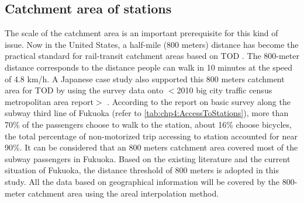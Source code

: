 \subsection{Catchment area of stations}
%
The scale of the catchment area is an important prerequisite for this kind of issue. Now in the United States, a half-mile (800 meters) distance has become the practical standard for rail-transit catchment areas based on TOD \cite{guerra2013half}. The 800-meter distance corresponds to the distance people can walk in 10 minutes at the speed of 4.8 km/h. A Japanese case study also supported this 800 meters catchment area for TOD by using the survey data onto $<$2010 big city traffic census metropolitan area report$>$ \cite{tadakatsu2015empirical}. According to the report on basic survey along the subway third line of Fukuoka (refer to \ref{tab:chp4:AccessToStations}), more than 70\% of the passengers choose to walk to the station, about 16\% choose bicycles, the total percentage of non-motorized trip accessing to station accounted for near 90\%. It can be considered that an 800 meters catchment area covered most of the subway passengers in Fukuoka. Based on the existing literature and the current situation of Fukuoka, the distance threshold of 800 meters is adopted in this study. All the data based on geographical information will be covered by the 800-meter catchment area using the areal interpolation method.

